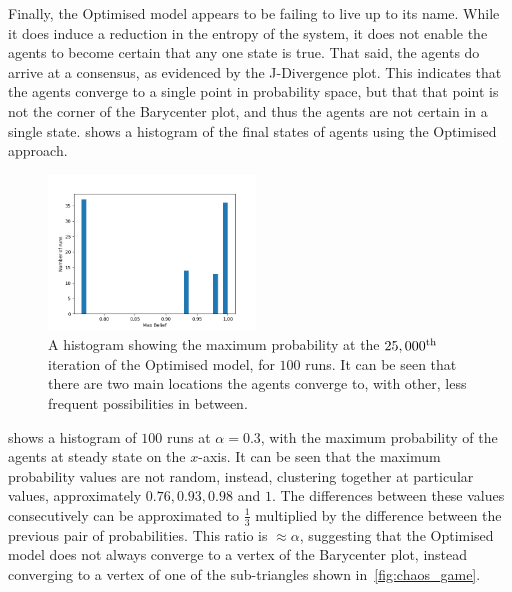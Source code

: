 Finally, the Optimised model appears to be failing to live up to its name. While it does induce a reduction in the entropy of the system, it does not enable the agents to become certain that any one state is true. That said, the agents do arrive at a consensus, as evidenced by the J-Divergence plot. This indicates that the agents converge to a single point in probability space, but that that point is not the corner of the Barycenter plot, and thus the agents are not certain in a single state.  shows a histogram of the final states of agents using the Optimised approach. 

\begin{figure}[H]
    \centering
    \includegraphics[width=0.49\textwidth]{Images/Figures/Optimised/ChaoticAttractorMaybe.png}
    \caption{ A histogram showing the maximum probability at the $25,000^\textnormal{th}$ iteration of the Optimised model, for $100$ runs. It can be seen that there are two main locations the agents converge to, with other, less frequent possibilities in between.  }
    \label{fig:optimised_problem_case}
\end{figure}

 shows a histogram of $100$ runs at $\alpha =0.3$, with the maximum probability of the agents at steady state on the $x$-axis. It can be seen that the maximum probability values are not random, instead, clustering together at particular values, approximately $0.76, 0.93, 0.98$ and $1$. The differences between these values consecutively can be approximated to $\frac{1}{3}$ multiplied by the difference between the previous pair of probabilities. This ratio is $\approx \alpha$, suggesting that the Optimised model does not always converge to a vertex of the Barycenter plot, instead converging to a vertex of one of the sub-triangles shown in~\cref{fig:chaos_game}. 

